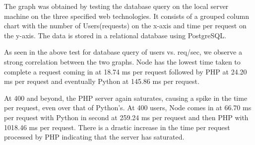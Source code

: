 \documentclass[../thesis.tex]{subfiles}
\begin{document}
\newpage
The graph was obtained by testing the database query on the local server machine on the three specified web technologies. It consists of a grouped column chart with the number of Users(requests) on the x-axis and time per request on the y-axis. The data is stored in a relational database using PostgreSQL.
\newline

As seen in the above test for database query of users vs. req/sec, we observe a strong correlation between the two graphs. Node has the lowest time taken to complete a request coming in at 18.74 ms per request followed by PHP at 24.20 ms per request and eventually Python at 145.86 ms per request.
\newline

At 400 and beyond, the PHP server again saturates, causing a spike in the time per request, even over that of Python's. At 400 users, Node comes in at 66.70 ms per request with Python in second at 259.24 ms per request and then PHP with 1018.46 ms per request. There is a drastic increase in the time per request processed by PHP indicating that the server has saturated.
\newline

\newpage
\end{document}
